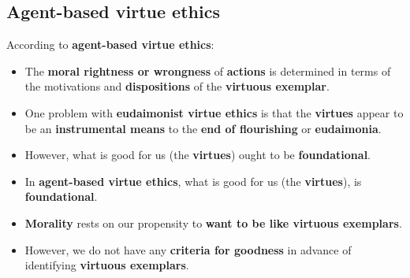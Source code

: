 \documentclass[11pt]{article}
\begin{document}
\subsection{Agent-based virtue ethics}
\label{sec:org247ed44}
According to \textbf{agent-based virtue ethics}:
\begin{itemize}
\item The \textbf{moral rightness or wrongness} of \textbf{actions} is determined in terms of the motivations and \textbf{dispositions} of the \textbf{virtuous exemplar}.
\item One problem with \textbf{eudaimonist virtue ethics} is that the \textbf{virtues} appear to be an \textbf{instrumental means} to the \textbf{end of flourishing} or \textbf{eudaimonia}.
\item However, what is good for us (the \textbf{virtues}) ought to be \textbf{foundational}.
\item In \textbf{agent-based virtue ethics}, what is good for us (the \textbf{virtues}), is \textbf{foundational}.
\item \textbf{Morality} rests on our propensity to \textbf{want to be like virtuous exemplars}.
\item However, we do not have any \textbf{criteria for goodness} in advance of identifying \textbf{virtuous exemplars}.
\end{itemize}

 \newpage
\end{document}
